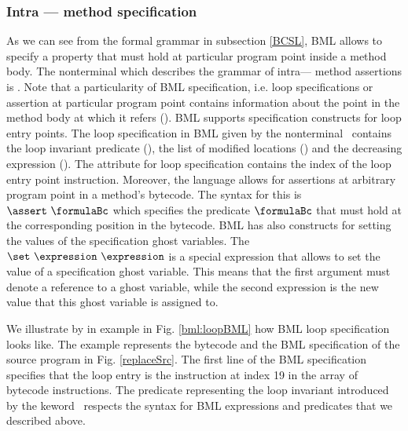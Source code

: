 \subsubsection{Intra --- method specification}
As we can see from the formal  grammar in subsection \ref{BCSL}, BML allows to specify a property that must hold at 
particular program point inside a method body. The nonterminal which describes the grammar of intra--- method assertions is
 \intraMethodSpec.
 Note that a particularity of BML specification, i.e. loop specifications or assertion at particular program point
 contains information about the point in the method body at which it refers (\atIndex).
BML supports specification constructs for loop entry points. The loop specification in BML given by the nonterminal \loopSpec \ 
contains the loop invariant predicate  (\loopInv), the list of modified locations (\loopMod) and
 the decreasing expression (\loopDecreases). The \atIndex{} attribute for loop specification contains the index of the loop entry point instruction.
Moreover, the language allows for assertions at arbitrary program point in a method's bytecode. The syntax for this is $\assert \ \formulaBc $
 which specifies the predicate $\formulaBc $ that must hold at the corresponding position in the bytecode.
BML has also constructs for setting the values of the specification ghost variables.  
The  $ \set \ \expression \  \expression $ is a special expression that allows to set the value of a specification ghost variable. This means
 that the first argument must denote a reference to a ghost variable, while the second expression is the new value that this 
ghost variable is assigned to. 

We illustrate by in example in Fig. \ref{bml:loopBML} how BML loop specification looks like.
The example  represents the bytecode and the BML specification of the source program in Fig. \ref{replaceSrc}. The first line of the BML specification 
specifies that the loop entry is the instruction at index  19 in the array of bytecode instructions. The predicate
 representing  the loop invariant introduced by the keword \loopInv \ respects the syntax for BML expressions and predicates
 that we described above. 
 
